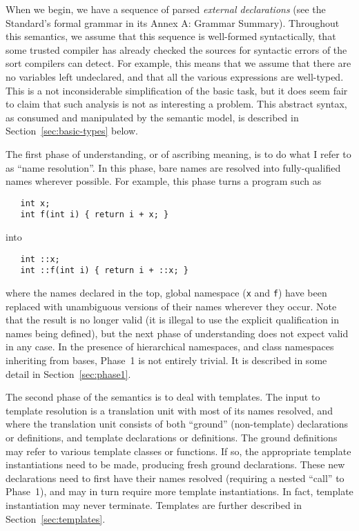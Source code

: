 \documentclass[11pt]{article}
\begin{document}
When we begin, we have a sequence of parsed \emph{external
  declarations} (see the Standard's formal grammar in its Annex A:
Grammar Summary).  Throughout this semantics, we assume that this
sequence is well-formed syntactically, that some trusted compiler has
already checked the sources for syntactic errors of the sort compilers
can detect.  For example, this means that we assume that there are no
variables left undeclared, and that all the various expressions are
well-typed.  This is a not inconsiderable simplification of the basic
task, but it does seem fair to claim that such analysis is not as
interesting a problem.  This abstract syntax, as consumed and
manipulated by the semantic model, is described in
Section~\ref{sec:basic-types} below.

The first phase of understanding, or
of ascribing meaning, is to do what I refer to as ``name resolution''.
In this phase, bare names are resolved into fully-qualified names
wherever possible.  For example, this phase turns a program such as
\begin{verbatim}
   int x;
   int f(int i) { return i + x; }
\end{verbatim}
into
\begin{verbatim}
   int ::x;
   int ::f(int i) { return i + ::x; }
\end{verbatim}
where the names declared in the top, global namespace (\texttt{x} and
\texttt{f}) have been replaced with unambiguous versions of their
names wherever they occur.  Note that the result is no longer valid
\cpp{} (it is illegal to use the explicit qualification in names being
defined), but the next phase of understanding does not expect valid
\cpp{} in any case.  In the presence of hierarchical namespaces, and
class namespaces inheriting from bases, Phase~1 is not entirely
trivial.  It is described in some detail in Section~\ref{sec:phase1}.

 The second phase of the semantics is to deal with
templates.  The input to template resolution is a translation unit
with most of its names resolved, and where the translation unit
consists of both ``ground'' (non-template) declarations or
definitions, and template declarations or definitions.  The ground
definitions may refer to various template classes or functions.  If
so, the appropriate template instantiations need to be made, producing
fresh ground declarations.  These new declarations need to first have
their names resolved (requiring a nested ``call'' to Phase~1), and may
in turn require more template instantiations.  In fact, template
instantiation may never terminate.  Templates are further described in
Section~\ref{sec:templates}.
\end{document}
